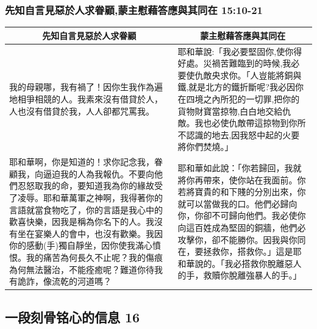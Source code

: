 \subsubsection{先知自言見惡於人求眷顧,蒙主慰藉答應與其同在 15:10-21}
\begin{table}[H]
\centering
\begin{tabular}{p{8.5cm}|p{8.750cm}}\hline\hline
\multicolumn{1}{c|}{先知自言見惡於人求眷顧}&\multicolumn{1}{c}{蒙主慰藉答應與其同在}\\\hline
我的母親哪，我有禍了！因你生我作為遍地相爭相競的人。我素來沒有借貸於人，人也沒有借貸於我，人人卻都咒罵我。 
&耶和華說:「我必要堅固你,使你得好處。災禍苦難臨到的時候,我必要使仇敵央求你。「人豈能將銅與鐵,就是北方的鐵折斷呢?我必因你在四境之內所犯的一切罪,把你的貨物財寶當掠物,白白地交給仇敵。我也必使仇敵帶這掠物到你所不認識的地去,因我怒中起的火要將你們焚燒。」\\\hline
耶和華啊，你是知道的！求你記念我，眷顧我，向逼迫我的人為我報仇。不要向他們忍怒取我的命，要知道我為你的緣故受了凌辱。耶和華萬軍之神啊，我得著你的言語就當食物吃了，你的言語是我心中的歡喜快樂，因我是稱為你名下的人。我沒有坐在宴樂人的會中，也沒有歡樂。我因你的感動(手)獨自靜坐，因你使我滿心憤恨。我的痛苦為何長久不止呢？我的傷痕為何無法醫治，不能痊癒呢？難道你待我有詭詐，像流乾的河道嗎？
&耶和華如此說：「你若歸回，我就將你再帶來，使你站在我面前。你若將寶貴的和下賤的分別出來，你就可以當做我的口。他們必歸向你，你卻不可歸向他們。我必使你向這百姓成為堅固的銅牆，他們必攻擊你，卻不能勝你。因我與你同在，要拯救你，搭救你。」這是耶和華說的。「我必搭救你脫離惡人的手，救贖你脫離強暴人的手。」\\\hline
\end{tabular}
\end{table}





\subsection{一段刻骨铭心的信息 16}

